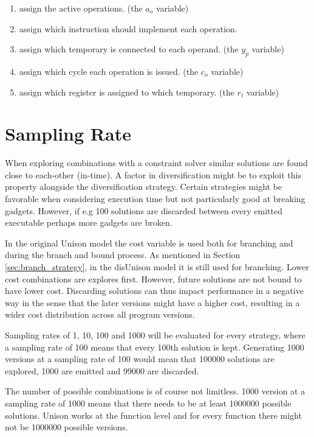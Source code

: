 \begin{enumerate}
	\item assign the active operations. (the $a_o$ variable)
	\item assign which instruction should implement each operation.
	\item assign which temporary is connected to each operand. (the $y_p$ variable)
	\item assign which cycle each operation is issued. (the $c_o$ variable)
	\item assign which register is assigned to which temporary. (the $r_t$ variable)
\end{enumerate}

\section{Sampling Rate}
\label{sec:sampling_rate}

When exploring combinations with a constraint solver similar solutions are found close to
each-other (in-time). A factor in diversification might be to exploit this property
alongside the diversification strategy. Certain strategies might be favorable when
considering execution time but not particularly good at breaking gadgets. However, if
e.g 100 solutions are discarded between every emitted executable perhaps more gadgets are
broken.

In the original Unison model the cost variable is used both for branching and during the
branch and bound process. As mentioned in Section \ref{sec:branch_strategy}, in the
disUnison model it is still used for branching. Lower cost combinations are explores
first. However, future solutions are not bound to have lower cost. Discarding solutions
can thus impact performance in a negative way in the sense that the later versions might
have a higher cost, resulting in a wider cost distribution across all program versions.

Sampling rates of 1, 10, 100 and 1000 will be evaluated for every strategy, where a
sampling rate of 100 means that every 100th solution is kept. Generating 1000 versions
at a sampling rate of 100 would mean that 100000 solutions are explored, 1000 are emitted
and 99000 are discarded.

The number of possible combinations is of course not limitless. 1000 version at a sampling
rate of 1000 means that there needs to be at least 1000000 possible solutions. Unison works
at the function level and for every function there might not be 1000000 possible versions.

